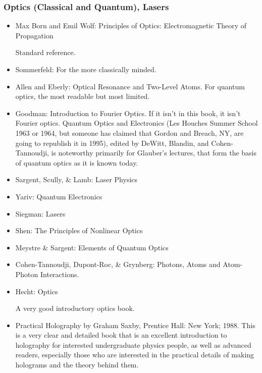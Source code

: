 \documentclass[10pt,a4paper]{book}
\theoremstyle{definition}
\begin{document}
\subsubsection{Optics (Classical and Quantum), Lasers}

\begin{itemize}
\item Max Born and Emil Wolf: Principles of Optics: Electromagnetic Theory of Propagation

Standard reference.

\item Sommerfeld: For the more classically minded.
\item Allen and Eberly: Optical Resonance and Two-Level Atoms.
For quantum optics, the most readable but most limited.
\item Goodman: Introduction to Fourier Optics.
If it isn't in this book, it isn't Fourier optics.
Quantum Optics and Electronics (Les Houches Summer School 1963 or 1964, but someone has claimed that Gordon and Breach, NY, are going to republish it in 1995), edited by DeWitt, Blandin, and Cohen- Tannoudji, is noteworthy primarily for Glauber's lectures, that form the basis of quantum optics as it is known today.
\item Sargent, Scully, \& Lamb: Laser Physics
\item Yariv: Quantum Electronics
\item Siegman: Lasers
\item Shen: The Principles of Nonlinear Optics
\item Meystre \& Sargent: Elements of Quantum Optics
\item Cohen-Tannoudji, Dupont-Roc, \& Grynberg: Photons, Atoms and Atom-Photon Interactions.
\item Hecht: Optics

A very good introductory optics book.

\item Practical Holography by Graham Saxby, Prentice Hall: New York; 1988.
This is a very clear and detailed book that is an excellent introduction to holography for interested undergraduate physics people, as well as advanced readers, especially those who are interested in the practical details of making holograms and the theory behind them.
\end{itemize}
\end{document}
